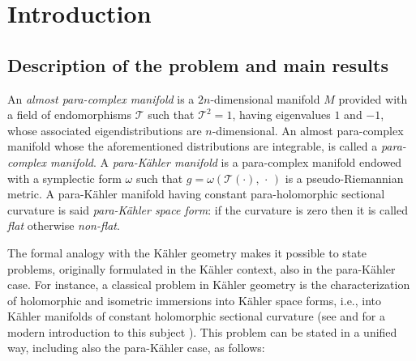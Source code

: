 \documentclass[11pt, reqno]{amsart}
\newcommand{\K }{K\"{a}hler }
\newcommand{\pk }{para-K\"{a}hler }
\begin{document}




\section{Introduction}


\subsection{Description of the problem and main results}
An \emph{almost para-complex manifold} is a $2n$-dimensional manifold $M$ provided with a field of endomorphisms $\mathcal{T}$ such that $\mathcal{T}^2=1$, having eigenvalues $1$ and $-1$, whose associated eigendistributions are $n$-dimensional. An almost para-complex manifold whose the aforementioned distributions are integrable, is called a \emph{para-complex manifold}.  
A \emph{\pk manifold} is a para-complex manifold endowed with a symplectic form $\omega$ such that $g=\omega\left(\mathcal{T}(\cdot),\,\cdot\,\right)$ is a pseudo-Riemannian metric. A \pk manifold having constant para-holomorphic sectional curvature is said \emph{\pk space form}: if the curvature is zero then it is called \emph{flat} otherwise \emph{non-flat}.



The formal analogy with the K\"ahler geometry makes it possible to state problems, originally formulated in the \K context, also in the \pk case. For instance, a classical  problem in K\"ahler geometry is the characterization of holomorphic and isometric immersions  into \K space forms, i.e., into   K\"ahler  manifolds of constant holomorphic sectional curvature (see \cite{Cal} and for a modern introduction to this subject \cite{loizedda}). This problem can be stated in a unified way, including also the \pk case, as follows:



%
\end{document}
